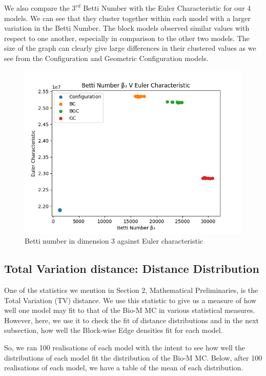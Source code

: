 We also compare the $3^{rd}$ Betti Number with the Euler Characteristic for our 4 models. We can see that they cluster together within each model with a larger variation in the Betti Number. The block models observed similar values with respect to one another, especially in comparison to the other two models. The size of the graph can clearly give large differences in their clustered values as we see from the Configuration and Geometric Configuration models.

\begin{figure}[H]
\begin{center}
\captionsetup{justification=centering}
\includegraphics[width=12cm]{graph/bVe.png}
\caption{Betti number in dimension 3 against Euler characteristic}
\end{center}
\end{figure}

\subsection{Total Variation distance: Distance Distribution}
One of the statistics we mention in Section 2, Mathematical Preliminaries, is the Total Variation (TV) distance. We use this statistic to give us a measure of how well one model may fit to that of the Bio-M MC in various statistical measures. However, here, we use it to check the fit of distance distributions and in the next subsection, how well the Block-wise Edge densities fit for each model.

So, we ran 100 realisations of each model with the intent to see how well the distributions of each model fit the distribution of the Bio-M MC. Below, after 100 realisations of each model, we have a table of the mean of each distribution.

